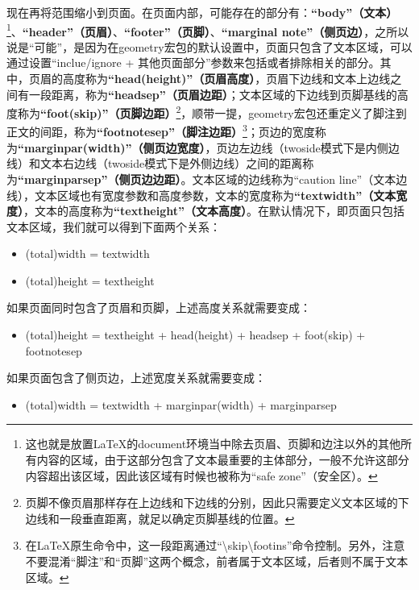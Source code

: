﻿\documentclass{article}
\begin{document}
现在再将范围缩小到页面。在页面内部，可能存在的部分有：\textbf{``body''（文本）}\footnote{这也就是放置\LaTeX 的document环境当中除去页眉、页脚和边注以外的其他所有内容的区域，由于这部分包含了文本最重要的主体部分，一般不允许这部分内容超出该区域，因此该区域有时候也被称为``safe zone''（安全区）。}、\textbf{``header''（页眉）}、\textbf{``footer''（页脚）}、\textbf{``marginal note''（侧页边）}，之所以说是``可能''，是因为在geometry宏包的默认设置中，页面只包含了文本区域，可以通过设置``inclue/ignore + 其他页面部分''参数来包括或者排除相关的部分。其中，页眉的高度称为\textbf{``head(height)''（页眉高度）}，页眉下边线和文本上边线之间有一段距离，称为\textbf{``headsep''（页眉边距）}；文本区域的下边线到页脚基线的高度称为\textbf{``foot(skip)''（页脚边距）}\footnote{页脚不像页眉那样存在上边线和下边线的分别，因此只需要定义文本区域的下边线和一段垂直距离，就足以确定页脚基线的位置。}，顺带一提，geometry宏包还重定义了脚注到正文的间距，称为\textbf{``footnotesep''（脚注边距）}\footnote{在\LaTeX 原生命令中，这一段距离通过``\textbackslash skip\textbackslash footins''命令控制。另外，注意不要混淆``脚注''和``页脚''这两个概念，前者属于文本区域，后者则不属于文本区域。}；页边的宽度称为\textbf{``marginpar(width)''（侧页边宽度）}，页边左边线（twoside模式下是内侧边线）和文本右边线（twoside模式下是外侧边线）之间的距离称为\textbf{``marginparsep''（侧页边边距）}。文本区域的边线称为``caution line''（文本边线），文本区域也有宽度参数和高度参数，文本的宽度称为\textbf{``textwidth''（文本宽度）}，文本的高度称为\textbf{``textheight''（文本高度）}。在默认情况下，即页面只包括文本区域，我们就可以得到下面两个关系：
\begin{itemize}
    \item (total)width = textwidth
    \item (total)height = textheight
\end{itemize}
如果页面同时包含了页眉和页脚，上述高度关系就需要变成：
\begin{itemize}
    \item (total)height = textheight + head(height) + headsep + foot(skip) + footnotesep
\end{itemize}
如果页面包含了侧页边，上述宽度关系就需要变成：
\begin{itemize}
    \item (total)width = textwidth + marginpar(width) + marginparsep
\end{itemize}

\end{document}
